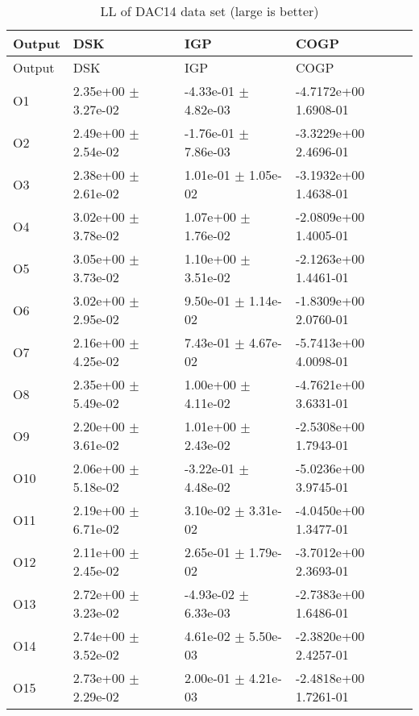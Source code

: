 \begin{longtable}[]{@{}llll@{}}
\caption{LL of DAC14 data set (large is better)}\tabularnewline
\toprule
Output & DSK & IGP & COGP\tabularnewline
\midrule
\endfirsthead
\toprule
Output & DSK & IGP & COGP\tabularnewline
\midrule
\endhead
O1 & 2.35e+00 \(\pm\) 3.27e-02 & -4.33e-01 \(\pm\) 4.82e-03 &
-4.7172e+00 1.6908-01\tabularnewline
O2 & 2.49e+00 \(\pm\) 2.54e-02 & -1.76e-01 \(\pm\) 7.86e-03 &
-3.3229e+00 2.4696-01\tabularnewline
O3 & 2.38e+00 \(\pm\) 2.61e-02 & 1.01e-01 \(\pm\) 1.05e-02 & -3.1932e+00
1.4638-01\tabularnewline
O4 & 3.02e+00 \(\pm\) 3.78e-02 & 1.07e+00 \(\pm\) 1.76e-02 & -2.0809e+00
1.4005-01\tabularnewline
O5 & 3.05e+00 \(\pm\) 3.73e-02 & 1.10e+00 \(\pm\) 3.51e-02 & -2.1263e+00
1.4461-01\tabularnewline
O6 & 3.02e+00 \(\pm\) 2.95e-02 & 9.50e-01 \(\pm\) 1.14e-02 & -1.8309e+00
2.0760-01\tabularnewline
O7 & 2.16e+00 \(\pm\) 4.25e-02 & 7.43e-01 \(\pm\) 4.67e-02 & -5.7413e+00
4.0098-01\tabularnewline
O8 & 2.35e+00 \(\pm\) 5.49e-02 & 1.00e+00 \(\pm\) 4.11e-02 & -4.7621e+00
3.6331-01\tabularnewline
O9 & 2.20e+00 \(\pm\) 3.61e-02 & 1.01e+00 \(\pm\) 2.43e-02 & -2.5308e+00
1.7943-01\tabularnewline
O10 & 2.06e+00 \(\pm\) 5.18e-02 & -3.22e-01 \(\pm\) 4.48e-02 &
-5.0236e+00 3.9745-01\tabularnewline
O11 & 2.19e+00 \(\pm\) 6.71e-02 & 3.10e-02 \(\pm\) 3.31e-02 &
-4.0450e+00 1.3477-01\tabularnewline
O12 & 2.11e+00 \(\pm\) 2.45e-02 & 2.65e-01 \(\pm\) 1.79e-02 &
-3.7012e+00 2.3693-01\tabularnewline
O13 & 2.72e+00 \(\pm\) 3.23e-02 & -4.93e-02 \(\pm\) 6.33e-03 &
-2.7383e+00 1.6486-01\tabularnewline
O14 & 2.74e+00 \(\pm\) 3.52e-02 & 4.61e-02 \(\pm\) 5.50e-03 &
-2.3820e+00 2.4257-01\tabularnewline
O15 & 2.73e+00 \(\pm\) 2.29e-02 & 2.00e-01 \(\pm\) 4.21e-03 &
-2.4818e+00 1.7261-01\tabularnewline
\bottomrule
\end{longtable}
